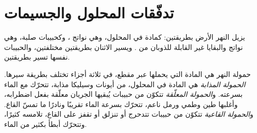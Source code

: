 \section{تدفّقات المحلول والجسيمات}\label{sec:b1:erosion-transport:fluxes}

يزيل النهر الأرض بطريقتين: كمادة في المحلول، وهي نواتج ، وكحبيبات صلبة، وهي نواتج  والبقايا غير القابلة للذوبان من . ويسير الاثنان بطريقتين مختلفتين، والحبيبات نفسها تسير بطريقتين.

\begin{definition}\label{def:b1:erosion-transport:load}
حمولة النهر هي المادة التي يحملها عبر مقطع، في ثلاثة أجزاء تختلف بطريقة سيرها. \emph{الحمولة المذابة} هي المادة في المحلول، من أيونات وسيليكا مذابة، تتحرّك مع الماء بسرعته. و\emph{الحمولة المعلّقة} تتكوّن من حبيبات يُبقيها الجريان معلّقة بفعل اضطرابه، وأغلبها طين وطمي ورمل ناعم، تتحرّك بسرعة الماء تقريبًا ونادرًا ما تمسّ القاع. و\emph{الحمولة القاعية} تتكوّن من حبيبات تتدحرج أو تنزلق أو تقفز على القاع، تلامسه كثيرًا، وتتحرّك أبطأ بكثير من الماء.
\end{definition}

